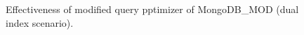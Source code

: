 \begin{figure}[t]
     \vspace*{-0.5\baselineskip}
     \caption{Effectiveness of modified \approachName query pptimizer of MongoDB\_MOD (dual index scenario).}
     \label{fig:mongo-v2-evaluation}
\end{figure}

%
